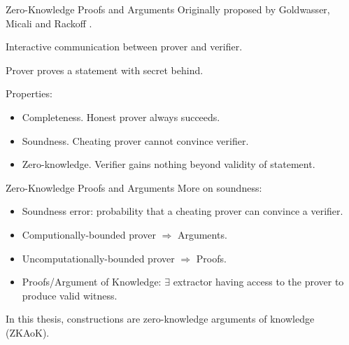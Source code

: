 \begin{frame}{Zero-Knowledge Proofs and Arguments}
	Originally proposed by Goldwasser, Micali and Rackoff \cite{GoldwasserMR85}.\pause
	
	Interactive communication between prover and verifier.\pause
	
	Prover proves a statement with secret behind.\pause
	
	Properties:\pause
	\begin{itemize}
		\item {\small Completeness. Honest prover always succeeds.}\pause
		\item {\small Soundness. Cheating prover cannot convince verifier.}\pause
		\item {\small Zero-knowledge. Verifier gains nothing beyond validity of statement.}
	\end{itemize}
\end{frame}

\begin{frame}{Zero-Knowledge Proofs and Arguments}
	More on soundness:\pause
	\begin{itemize}
		\item Soundness error: probability that a cheating prover can convince a verifier.\pause 
		\item Computionally-bounded prover $\Rightarrow$ Arguments. \pause
		\item Uncomputationally-bounded prover $\Rightarrow$ Proofs.\pause
		\item Proofs/Argument of Knowledge: $\exists$ extractor having access to the prover to produce valid witness.\pause
	\end{itemize}

	In this thesis, constructions are zero-knowledge arguments of knowledge (ZKAoK).
\end{frame}
